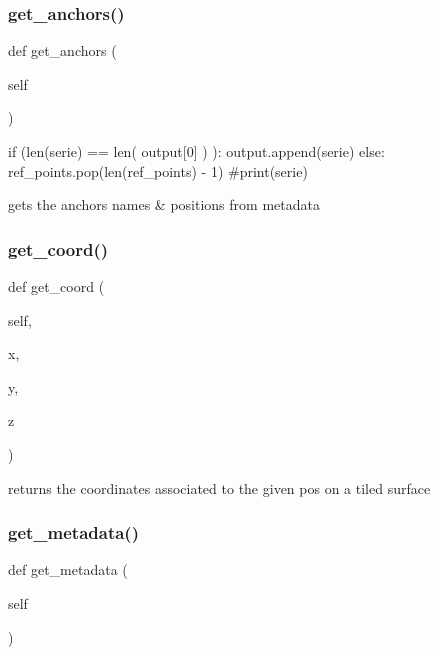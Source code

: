 \subsubsection{\texorpdfstring{get\+\_\+anchors()}{get\_anchors()}}
{\footnotesize\ttfamily def get\+\_\+anchors (\begin{DoxyParamCaption}\item[{}]{self }\end{DoxyParamCaption})}



if (len(serie) == len( output\mbox{[}0\mbox{]} ) )\+: output.\+append(serie) else\+: ref\+\_\+points.\+pop(len(ref\+\_\+points) -\/ 1) \#print(serie) 

\begin{DoxyVerb}gets the anchors names & positions from metadata\end{DoxyVerb}
 \mbox{\label{classread_mes_1_1_measurements_aec61a49900a125b0b6f614e94fba7003}} 
\subsubsection{\texorpdfstring{get\+\_\+coord()}{get\_coord()}}
{\footnotesize\ttfamily def get\+\_\+coord (\begin{DoxyParamCaption}\item[{}]{self,  }\item[{}]{x,  }\item[{}]{y,  }\item[{}]{z }\end{DoxyParamCaption})}

\begin{DoxyVerb}returns the coordinates associated to the given pos on a tiled surface\end{DoxyVerb}
 \mbox{\label{classread_mes_1_1_measurements_a4bf6b24f95dbd9e6388503f474e0be05}} 
\subsubsection{\texorpdfstring{get\+\_\+metadata()}{get\_metadata()}}
{\footnotesize\ttfamily def get\+\_\+metadata (\begin{DoxyParamCaption}\item[{}]{self }\end{DoxyParamCaption})}

